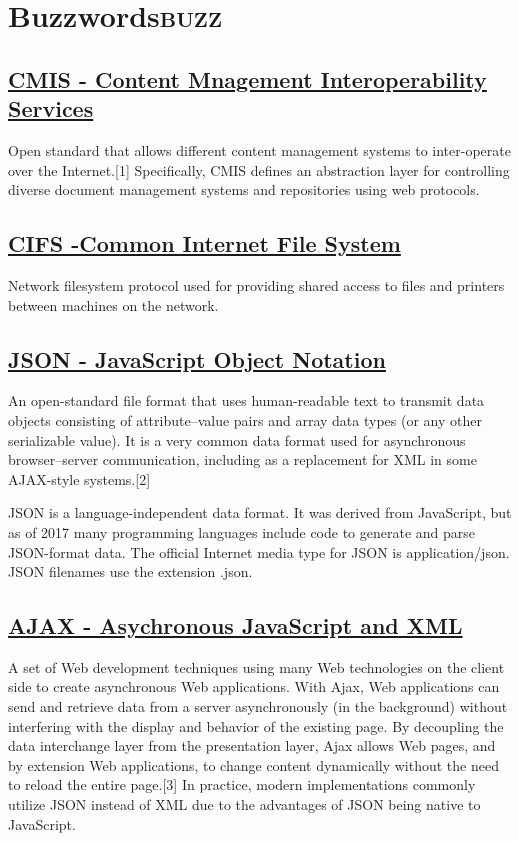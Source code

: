 \documentclass[11pt]{article}
\date{\today}
\title{}
\begin{document}
\tableofcontents

\section{Buzzwords\hfill{}\textsc{buzz}}
\label{sec:org275d038}
\subsection{\href{https://chemistry.apache.org/project/cmis.html}{CMIS - Content Mnagement Interoperability Services}}
\label{sec:orgf7da0db}
Open standard that allows different content management systems to inter-operate over the Internet.[1] Specifically, CMIS defines an abstraction layer for controlling diverse document management systems and repositories using web protocols.
\subsection{\href{http://cifs.com/}{CIFS -Common Internet File System}}
\label{sec:orgad33872}
Network filesystem protocol used for providing shared access to files and printers between machines on the network.
\subsection{\href{https://en.wikipedia.org/wiki/JSON}{JSON - JavaScript Object Notation}}
\label{sec:org5c284ea}
An open-standard file format that uses human-readable text to transmit data objects consisting of attribute–value pairs and array data types (or any other serializable value). It is a very common data format used for asynchronous browser–server communication, including as a replacement for XML in some AJAX-style systems.[2]

JSON is a language-independent data format. It was derived from JavaScript, but as of 2017 many programming languages include code to generate and parse JSON-format data. The official Internet media type for JSON is application/json. JSON filenames use the extension .json.
\subsection{\href{https://en.wikipedia.org/wiki/Ajax\_(programming)}{AJAX - Asychronous JavaScript and XML}}
\label{sec:org6285b13}
A set of Web development techniques using many Web technologies on the client side to create asynchronous Web applications. With Ajax, Web applications can send and retrieve data from a server asynchronously (in the background) without interfering with the display and behavior of the existing page. By decoupling the data interchange layer from the presentation layer, Ajax allows Web pages, and by extension Web applications, to change content dynamically without the need to reload the entire page.[3] In practice, modern implementations commonly utilize JSON instead of XML due to the advantages of JSON being native to JavaScript.
\end{document}
